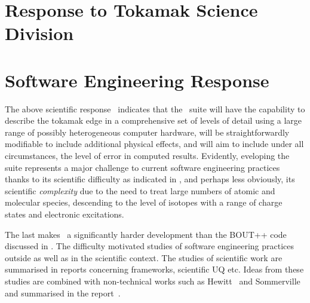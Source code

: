 
\newcommand{\red}{\itshape}
\newcommand{\blue}{\itshape}
\newcommand{\green}{\itshape}


\section{Response to Tokamak Science Division}\label{sec:response_physics}


\clearpage

\clearpage

\clearpage

\begin{subappendices}

\end{subappendices}

\section{Software Engineering Response}\label{sec:TS_sw_response}
The above scientific response~  indicates that the \nep \ suite
will have the capability to describe the tokamak edge in a 
comprehensive set of levels of detail using a large range of possibly 
heterogeneous computer hardware, will be straightforwardly modifiable to 
include additional physical effects, and will aim to include under all 
circumstances, the level of error in computed results.
Evidently, eveloping the suite represents a major challenge to current software engineering
practices thanks to its scientific difficulty as indicated in ,
and perhaps less obviously, its scientific \emph{complexity} due to the need to treat
large numbers of atomic and molecular species, descending to the level of isotopes
with a range of charge states and electronic excitations.

The last  makes \nep \ a  significantly harder development than the BOUT++ code
discussed in . The difficulty motivated studies of software
engineering practices outside as well as in the scientific context.
The studies of scientific work are summarised in reports  concerning frameworks,
scientific UQ etc. Ideas from these studies are combined with non-technical works
such as Hewitt~\cite{hewitt} and Sommerville~\cite{sommerville} and
summarised in the report~\cite{y2d34}. 

